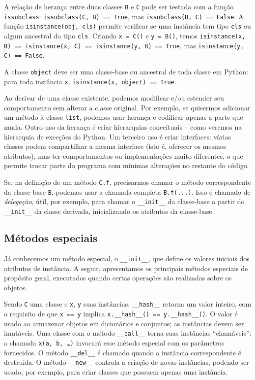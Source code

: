 \documentclass[11pt,a4paper]{article}
\begin{document}
A relação de herança entre duas classes \texttt{B} e \texttt{C} pode ser
testada com a função \texttt{issubclass}:
\texttt{issubclass(C, B) == True}, mas \texttt{issubclass(B, C) ==
False}. A função \texttt{isinstance(obj, cls)} permite verificar se uma
instância tem tipo \texttt{cls} ou algum ancestral do tipo \texttt{cls}.
Criando \texttt{x = C()} e \texttt{y = B()}, temos
\texttt{isinstance(x, B) == isinstance(x, C) == isinstance(y, B) ==
True}, mas \texttt{isinstance(y, C) == False}.

A classe \texttt{object} deve ser uma classe-base ou ancestral de toda
classe em Python: para toda instância \texttt{x},
\texttt{isinstance(x, object) == True}.

Ao derivar de uma classe existente, podemos modificar e/ou estender seu
comportamento sem alterar a classe original. Por exemplo, se quisermos
adicionar um método à classe \texttt{list}, podemos usar herança e
codificar apenas a parte que muda. Outro uso da herança é criar
hierarquias conceituais -- como veremos na hierarquia de exceções do
Python. Um terceiro uso é criar interfaces: várias classes podem
compartilhar a mesma interface (isto é, oferecer os mesmos atributos),
mas ter comportamentos ou implementações muito diferentes, o que permite
trocar parte do programa com mínimas alterações no restante do código.

Se, na definição de um método \texttt{C.f}, precisarmos chamar o método
correspondente da classe-base \texttt{B}, podemos usar a chamada completa
\texttt{B.f(...)}. Isso é chamado de \emph{delegação}, útil, por exemplo,
para chamar o \texttt{\_\_init\_\_} da classe-base a partir do
\texttt{\_\_init\_\_} da classe derivada, inicializando os atributos da
classe-base.

\subsection{Métodos especiais}

Já conhecemos um método especial, o \texttt{\_\_init\_\_}, que define os
valores iniciais dos atributos de instância. A seguir, apresentamos os
principais métodos especiais de propósito geral, executados quando certas
operações são realizadas sobre os objetos.

Sendo \texttt{C} uma classe e \texttt{x}, \texttt{y} suas instâncias:
\texttt{\_\_hash\_\_} retorna um valor inteiro, com o requisito de que
\texttt{x == y} implica \texttt{x.\_\_hash\_\_() == y.\_\_hash\_\_()}. O
valor é usado ao armazenar objetos em dicionários e conjuntos; as
instâncias devem ser imutáveis. Uma classe com o método
\texttt{\_\_call\_\_} torna suas instâncias ``chamáveis'': a chamada
\texttt{x(a, b, \dots)} invocará esse método especial com os parâmetros
fornecidos. O método \texttt{\_\_del\_\_} é chamado quando a instância
correspondente é destruída. O método \texttt{\_\_new\_\_} controla a
criação de novas instâncias, podendo ser usado, por exemplo, para criar
classes que possuem apenas uma instância.
\end{document}
